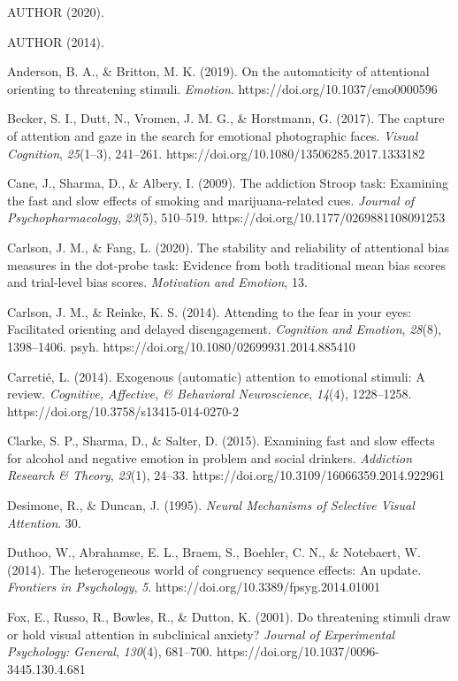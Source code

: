 \documentclass{article}
\begin{document}
AUTHOR (2020). 

AUTHOR (2014). 

Anderson, B. A., \& Britton, M. K. (2019). On the automaticity of attentional orienting to threatening stimuli. \emph{Emotion}. https://doi.org/10.1037/emo0000596

Becker, S. I., Dutt, N., Vromen, J. M. G., \& Horstmann, G. (2017). The capture of attention and gaze in the search for emotional photographic faces. \emph{Visual Cognition}, \emph{25}(1--3), 241--261. https://doi.org/10.1080/13506285.2017.1333182

Cane, J., Sharma, D., \& Albery, I. (2009). The addiction Stroop task: Examining the fast and slow effects of smoking and marijuana-related cues. \emph{Journal of Psychopharmacology}, \emph{23}(5), 510--519. https://doi.org/10.1177/0269881108091253

Carlson, J. M., \& Fang, L. (2020). The stability and reliability of attentional bias measures in the dot-probe task: Evidence from both traditional mean bias scores and trial-level bias scores. \emph{Motivation and Emotion}, 13.

Carlson, J. M., \& Reinke, K. S. (2014). Attending to the fear in your eyes: Facilitated orienting and delayed disengagement. \emph{Cognition and Emotion}, \emph{28}(8), 1398--1406. psyh. https://doi.org/10.1080/02699931.2014.885410

Carretié, L. (2014). Exogenous (automatic) attention to emotional stimuli: A review. \emph{Cognitive, Affective, \& Behavioral Neuroscience}, \emph{14}(4), 1228--1258. https://doi.org/10.3758/s13415-014-0270-2

Clarke, S. P., Sharma, D., \& Salter, D. (2015). Examining fast and slow effects for alcohol and negative emotion in problem and social drinkers. \emph{Addiction Research \& Theory}, \emph{23}(1), 24--33. https://doi.org/10.3109/16066359.2014.922961

Desimone, R., \& Duncan, J. (1995). \emph{Neural Mechanisms of Selective Visual Attention}. 30.

Duthoo, W., Abrahamse, E. L., Braem, S., Boehler, C. N., \& Notebaert, W. (2014). The heterogeneous world of congruency sequence effects: An update. \emph{Frontiers in Psychology}, \emph{5}. https://doi.org/10.3389/fpsyg.2014.01001

Fox, E., Russo, R., Bowles, R., \& Dutton, K. (2001). Do threatening stimuli draw or hold visual attention in subclinical anxiety? \emph{Journal of Experimental Psychology: General}, \emph{130}(4), 681--700. https://doi.org/10.1037/0096-3445.130.4.681
\end{document}
